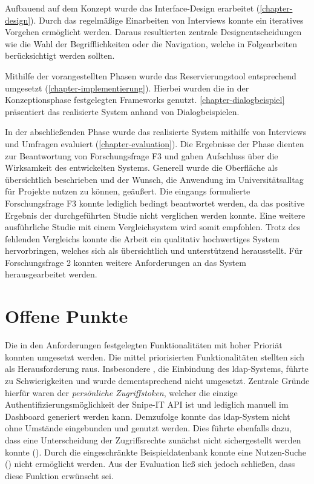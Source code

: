 Aufbauend auf dem Konzept wurde das Interface-Design erarbeitet
(\ref{chapter-design}). Durch das regelmäßige Einarbeiten von Interviews konnte
ein iteratives Vorgehen ermöglicht werden. Daraus resultierten zentrale
Designentscheidungen wie die Wahl der Begrifflichkeiten oder die Navigation, welche in
Folgearbeiten berücksichtigt werden sollten.

Mithilfe der vorangestellten Phasen wurde das Reservierungstool entsprechend
umgesetzt (\ref{chapter-implementierung}). Hierbei wurden die in der
Konzeptionsphase festgelegten Frameworks genutzt. \ref{chapter-dialogbeispiel}
präsentiert das realisierte System anhand von Dialogbeispielen.

In der abschließenden Phase wurde das realisierte System mithilfe von Interviews
und Umfragen evaluiert (\ref{chapter-evaluation}). Die Ergebnisse der Phase
dienten zur Beantwortung von Forschungsfrage F3 und gaben Aufschluss über die
Wirksamkeit des entwickelten Systems. Generell wurde die Oberfläche als
übersichtlich beschrieben und der Wunsch, die Anwendung im Universitätsalltag
für Projekte nutzen zu können, geäußert. Die eingangs formulierte Forschungsfrage
F3 konnte lediglich bedingt beantwortet werden, da das positive Ergebnis der
durchgeführten Studie nicht verglichen werden konnte. Eine weitere ausführliche
Studie mit einem Vergleichsystem wird somit empfohlen. Trotz des fehlenden
Vergleichs konnte die Arbeit ein qualitativ hochwertiges System hervorbringen,
welches sich als übersichtlich und unterstützend herausstellt. Für
Forschungsfrage 2 konnten weitere Anforderungen an das System herausgearbeitet
werden.

\section{Offene Punkte}
\label{sec:punkte}
Die in den Anforderungen festgelegten Funktionalitäten mit hoher Prioriät
konnten umgesetzt werden. Die mittel priorisierten Funktionalitäten stellten
sich als Herausforderung raus. Insbesondere , die Einbindung des
\ac{ldap}-Systems, führte zu Schwierigkeiten und wurde dementsprechend nicht
umgesetzt. Zentrale Gründe hierfür waren der \textit{persönliche
    Zugriffstoken}, welcher die einzige Authentifizierungsmöglichkeit der Snipe-IT
API ist und lediglich manuell im Dashboard generiert werden kann. Demzufolge
konnte das \ac{ldap}-System nicht ohne Umstände eingebunden und genutzt
werden. Dies führte ebenfalls dazu, dass eine Unterscheidung der Zugriffsrechte
zunächst nicht sichergestellt werden konnte (). Durch die
eingeschränkte Beispieldatenbank konnte eine Nutzen-Suche () nicht
ermöglicht werden. Aus der Evaluation ließ sich jedoch schließen, dass diese
Funktion erwünscht sei.

